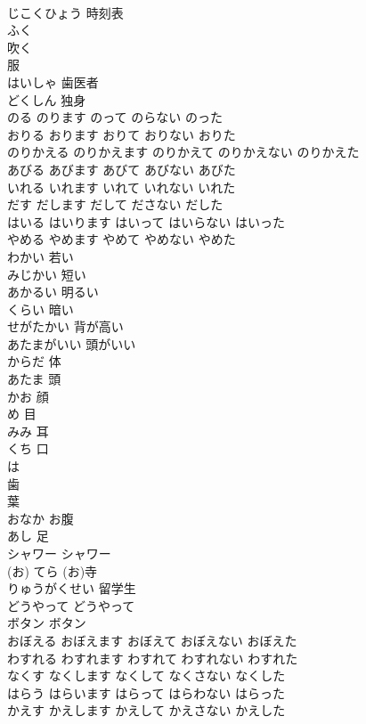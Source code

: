 \documentclass[8pt]{extreport}
\begin{document}
\begin{CJK}{UTF8}{min}
\\	じこくひょう	時刻表
\\	ふく	
\\	吹く 
\\	服
\\	はいしゃ	歯医者
\\	どくしん	独身
\\	のる	のります	のって	のらない	のった	
\\	おりる	おります	おりて	おりない	おりた	
\\	のりかえる	のりかえます	のりかえて	のりかえない	のりかえた	
\\	あびる	あびます	あびて	あびない	あびた	
\\	いれる	いれます	いれて	いれない	いれた	
\\	だす	だします	だして	ださない	だした	
\\	はいる	はいります	はいって	はいらない	はいった	
\\	やめる	やめます	やめて	やめない	やめた	
\\	わかい	若い
\\	みじかい	短い
\\	あかるい	明るい
\\	くらい	暗い
\\	せがたかい	背が高い
\\	あたまがいい	頭がいい
\\	からだ	体
\\	あたま	頭
\\	かお	顔
\\	め	目
\\	みみ	耳
\\	くち	口
\\	は	
\\	歯 
\\	葉
\\	おなか	お腹
\\	あし	足
\\	シャワー	シャワー
\\	(お) てら	(お)寺
\\	りゅうがくせい	留学生
\\	どうやって	どうやって
\\	ボタン	ボタン
\\	おぼえる	おぼえます	おぼえて	おぼえない	おぼえた	
\\	わすれる	わすれます	わすれて	わすれない	わすれた	
\\	なくす	なくします	なくして	なくさない	なくした	
\\	はらう	はらいます	はらって	はらわない	はらった	
\\	かえす	かえします	かえして	かえさない	かえした	

\end{CJK}
\end{document}
